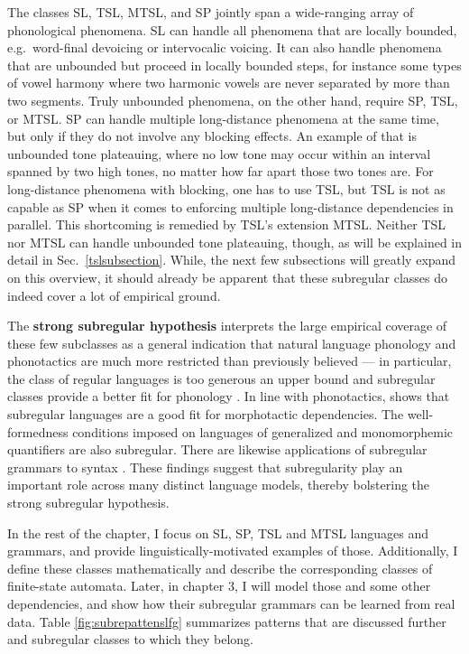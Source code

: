 The classes SL, TSL, MTSL, and SP jointly span a wide-ranging array of phonological phenomena.
SL can handle all phenomena that are locally bounded, e.g.\ word-final devoicing or intervocalic voicing.
It can also handle phenomena that are unbounded but proceed in locally bounded steps, for instance some types of vowel harmony where two harmonic vowels are never separated by more than two segments.
Truly unbounded phenomena, on the other hand, require SP, TSL, or MTSL\@.
SP can handle multiple long-distance phenomena at the same time, but only if they do not involve any blocking effects.
An example of that is unbounded tone plateauing, where no low tone may occur within an interval spanned by two high tones, no matter how far apart those two tones are.
For long-distance phenomena with blocking, one has to use TSL, but TSL is not as capable as SP when it comes to enforcing multiple long-distance dependencies in parallel.
This shortcoming is remedied by TSL's extension MTSL\@.
Neither TSL nor MTSL can handle unbounded tone plateauing, though, as will be explained in detail in Sec.~\ref{tslsubsection}.
While, the next few subsections will greatly expand on this overview, it should already be apparent that these subregular classes do indeed cover a lot of empirical ground.

The \textbf{strong subregular hypothesis} interprets the large empirical coverage of these few subclasses as a general indication that natural language phonology and phonotactics are much more restricted than previously believed --- in particular, the class of regular languages is too generous an upper bound and subregular classes provide a better fit for phonology \citep{Heinz10ldp}.
In line with phonotactics, \cite{AksenovaEtAl16} shows that subregular languages are a good fit for morphotactic dependencies.
The well-formedness conditions imposed on languages of generalized and monomorphemic quantifiers are also subregular.
There are likewise applications of subregular grammars to syntax  \citep{Graf17Rutgerstalk,DeSantoGrafDrury2017,VuEtAl19SCiL}.
These findings suggest that subregularity play an important role across many distinct language models, thereby bolstering the strong subregular hypothesis.

In the rest of the chapter, I focus on SL, SP, TSL and MTSL languages and grammars, and provide linguistically-motivated examples of those.
Additionally, I define these classes mathematically and describe the corresponding classes of finite-state automata.
Later, in chapter 3, I will model those and some other dependencies, and show how their subregular grammars can be learned from real data.
Table \ref{fig:subrepattenslfg} summarizes patterns that are discussed further and subregular classes to which they belong.


